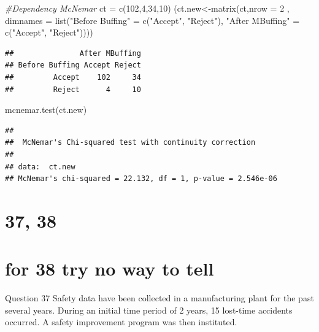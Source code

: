 \documentclass[
]{article}
\newenvironment{Shaded}{\begin{snugshade}}{\end{snugshade}}
\newcommand{\AttributeTok}[1]{\textcolor[rgb]{0.77,0.63,0.00}{#1}}
\newcommand{\CommentTok}[1]{\textcolor[rgb]{0.56,0.35,0.01}{\textit{#1}}}
\newcommand{\DecValTok}[1]{\textcolor[rgb]{0.00,0.00,0.81}{#1}}
\newcommand{\FunctionTok}[1]{\textcolor[rgb]{0.00,0.00,0.00}{#1}}
\newcommand{\NormalTok}[1]{#1}
\newcommand{\OtherTok}[1]{\textcolor[rgb]{0.56,0.35,0.01}{#1}}
\newcommand{\StringTok}[1]{\textcolor[rgb]{0.31,0.60,0.02}{#1}}
\begin{document}
\begin{Shaded}
\begin{Highlighting}[]
\CommentTok{\#Dependency McNemar}
\NormalTok{ct }\OtherTok{=} \FunctionTok{c}\NormalTok{(}\DecValTok{102}\NormalTok{,}\DecValTok{4}\NormalTok{,}\DecValTok{34}\NormalTok{,}\DecValTok{10}\NormalTok{)}
\NormalTok{(ct.new}\OtherTok{\textless{}{-}}\FunctionTok{matrix}\NormalTok{(ct,}\AttributeTok{nrow =} \DecValTok{2}
\NormalTok{                , }\AttributeTok{dimnames =} \FunctionTok{list}\NormalTok{(}\StringTok{"Before Buffing"} \OtherTok{=} \FunctionTok{c}\NormalTok{(}\StringTok{"Accept"}\NormalTok{, }\StringTok{"Reject"}\NormalTok{),}
                                  \StringTok{"After MBuffing"} \OtherTok{=} \FunctionTok{c}\NormalTok{(}\StringTok{"Accept"}\NormalTok{, }\StringTok{"Reject"}\NormalTok{))))}
\end{Highlighting}
\end{Shaded}

\begin{verbatim}
##               After MBuffing
## Before Buffing Accept Reject
##         Accept    102     34
##         Reject      4     10
\end{verbatim}

\begin{Shaded}
\begin{Highlighting}[]
\FunctionTok{mcnemar.test}\NormalTok{(ct.new)}
\end{Highlighting}
\end{Shaded}

\begin{verbatim}
## 
##  McNemar's Chi-squared test with continuity correction
## 
## data:  ct.new
## McNemar's chi-squared = 22.132, df = 1, p-value = 2.546e-06
\end{verbatim}

\hypertarget{section-2}{%
\section{37, 38}\label{section-2}}

\hypertarget{for-38-try-no-way-to-tell}{%
\section{for 38 try no way to tell}\label{for-38-try-no-way-to-tell}}

Question 37 Safety data have been collected in a manufacturing plant for
the past several years. During an initial time period of 2 years, 15
lost-time accidents occurred. A safety improvement program was then
instituted.
\end{document}
